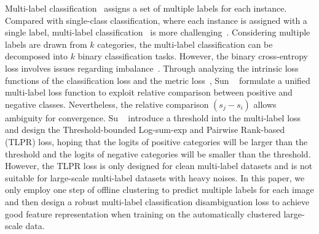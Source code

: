 Multi-label classification~\cite{tsoumakas2007multi,zhang2013review} assigns a set of multiple labels for each instance. Compared with single-class classification, where each instance is assigned with a single label, multi-label classification~\cite{yang2016exploit,zhao2021transformer,Xia_2023_ICCV} is more challenging~\cite{liu2017easy,liu2021emerging}. Considering multiple labels are drawn from $k$ categories, the multi-label classification can be decomposed into $k$ binary classification tasks. However, the binary cross-entropy loss involves issues regarding imbalance~\cite{ridnik2021asymmetric}. Through analyzing the intrinsic loss functions
of the classification loss and the metric loss~\cite{wang2019multi}, Sun \etal~\cite{sun2020circle} formulate a unified multi-label loss function to exploit relative comparison between positive and negative classes. Nevertheless, the relative comparison $(s_j-s_i)$ allows ambiguity for convergence. Su \etal~\cite{su2022zlpr} introduce a threshold into the multi-label loss and design the Threshold-bounded Log-sum-exp and Pairwise Rank-based (TLPR) loss, hoping that the logits of positive categories will be larger than the threshold and the logits of negative categories will be smaller than the threshold. However, the TLPR loss is only designed for clean multi-label datasets and is not suitable for large-scale multi-label datasets with heavy noises.
In this paper, we only employ one step of offline clustering to predict multiple labels for each image and then design a robust multi-label classification disambiguation loss to achieve good feature representation when training on the automatically clustered large-scale data.

